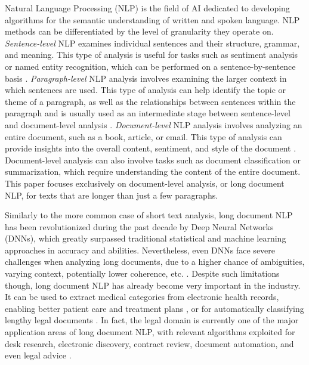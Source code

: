 \documentclass[preprint,review,10pt]{elsarticle}
\begin{document}
	Natural Language Processing (NLP) is the field of AI dedicated to developing algorithms for the semantic understanding of written and spoken language. NLP methods can be differentiated by the level of granularity they operate on. \textit{Sentence-level} NLP examines individual sentences and their structure, grammar, and meaning. This type of analysis is useful for tasks such as sentiment analysis or named entity recognition, which can be performed on a sentence-by-sentence basis \cite{borgir}. \textit{Paragraph-level} NLP analysis involves examining the larger context in which sentences are used. This type of analysis can help identify the topic or theme of a paragraph, as well as the relationships between sentences within the paragraph and is usually used as an intermediate stage between sentence-level and document-level analysis \cite{andrew} \cite{guo} \cite{jiwei}. \textit{Document-level} NLP analysis involves analyzing an entire document, such as a book, article, or email. This type of analysis can provide insights into the overall content, sentiment, and style of the document \cite{wei}\cite{timothy}. Document-level analysis can also involve tasks such as document classification or summarization, which require understanding the content of the entire document. This paper focuses exclusively on document-level analysis, or long document NLP, for texts that are longer than just a few paragraphs.
	
	Similarly to the more common case of short text analysis, long document NLP has been revolutionized during the past decade by Deep Neural Networks (DNNs), which greatly surpassed traditional statistical and machine learning approaches in accuracy and abilities. Nevertheless, even DNNs face severe challenges when analyzing long documents, due to a higher chance of ambiguities, varying context, potentially lower coherence, etc. \cite{hold}. Despite such limitations though, long document NLP has already become very important in the industry. It can be used to extract medical categories from electronic health records, enabling better patient care and treatment plans \cite{vithya}, or for automatically classifying lengthy legal documents \cite{lulu} \cite{bambroo}. In fact, the legal domain is currently one of the major application areas of long document NLP, with relevant algorithms exploited for desk research, electronic discovery, contract review, document automation, and even legal advice \cite{dale}.
	
\end{document}
